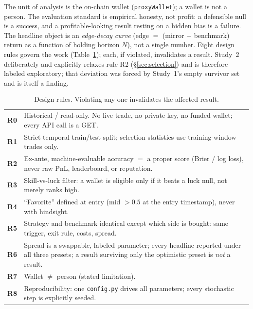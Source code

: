 \documentclass[11pt]{article}
\begin{document}
\medskip
The unit of analysis is the on-chain wallet (\texttt{proxyWallet}); a wallet is not a person.
The evaluation standard is empirical honesty, not profit: a defensible null is a success, and a
profitable-looking result resting on a hidden bias is a failure. The headline object is an
\emph{edge-decay curve} (edge $=$ (mirror $-$ benchmark) return as a function of holding
horizon $N$), not a single number. Eight design rules govern the work
(Table~\ref{tab:rules}); each, if violated, invalidates a result. Study~2 deliberately and
explicitly relaxes rule R2 (\S\ref{sec:selection}) and is therefore labeled exploratory; that
deviation was forced by Study~1's empty survivor set and is itself a finding.

\begin{table}[h]
\centering
\caption{Design rules. Violating any one invalidates the affected result.}
\label{tab:rules}
\small
\begin{tabular}{@{}cp{13.2cm}@{}}
\toprule
\textbf{R0} & Historical / read-only. No live trade, no private key, no funded wallet; every API call is a GET. \\
\textbf{R1} & Strict temporal train/test split; selection statistics use training-window trades only. \\
\textbf{R2} & Ex-ante, machine-evaluable accuracy $=$ a proper score (Brier / log loss), never raw PnL, leaderboard, or reputation. \\
\textbf{R3} & Skill-vs-luck filter: a wallet is eligible only if it beats a luck null, not merely ranks high. \\
\textbf{R4} & ``Favorite'' defined at entry (mid $>0.5$ at the entry timestamp), never with hindsight. \\
\textbf{R5} & Strategy and benchmark identical except which side is bought: same trigger, exit rule, costs, spread. \\
\textbf{R6} & Spread is a swappable, labeled parameter; every headline reported under all three presets; a result surviving only the optimistic preset is \emph{not} a result. \\
\textbf{R7} & Wallet $\neq$ person (stated limitation). \\
\textbf{R8} & Reproducibility: one \texttt{config.py} drives all parameters; every stochastic step is explicitly seeded. \\
\bottomrule
\end{tabular}
\end{table}

\end{document}
